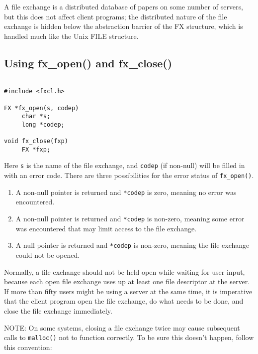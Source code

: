 A file exchange is a distributed database of papers on some number of
servers, but this does not affect client programs; the distributed
nature of the file exchange is hidden below the abstraction barrier of
the FX structure, which is handled much like the Unix FILE structure.

\subsection{Using fx\_open() and fx\_close()}

\begin{verbatim}

#include <fxcl.h>

FX *fx_open(s, codep)
     char *s;
     long *codep;

void fx_close(fxp)
     FX *fxp;

\end{verbatim}

Here \verb+s+ is the name of the file exchange, and \verb+codep+ (if
non-null) will be filled in with an error code.  There are three
possibilities for the error status of \verb+fx_open()+.

\begin{enumerate}

\item A non-null pointer is returned and \verb+*codep+ is zero,
meaning no error was encountered.

\item A non-null pointer is returned and \verb+*codep+ is non-zero,
meaning some error was encountered that may limit access to the file
exchange.

\item A null pointer is returned and \verb+*codep+ is non-zero,
meaning the file exchange could not be opened.

\end{enumerate}

Normally, a file exchange should not be held open while waiting for
user input, because each open file exchange uses up at least one file
descriptor at the server.  If more than fifty users might be using a
server at the same time, it is imperative that the client program open
the file exchange, do what needs to be done, and close the file
exchange immediately.

NOTE: On some systems, closing a file exchange twice may cause
subsequent calls to \verb+malloc()+ not to function correctly.  To be
sure this doesn't happen, follow this convention:

